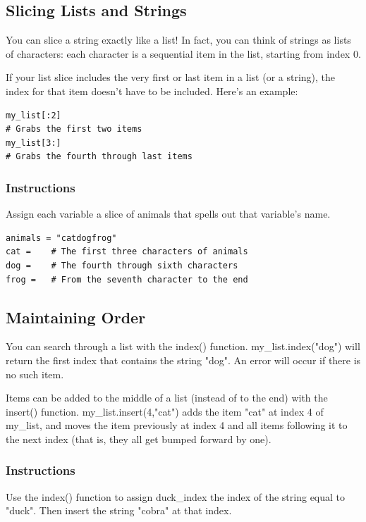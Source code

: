 \documentclass[12pt,a4paper,final,twoside,onecolumn,titlepage]{book}
\begin{document}
\subsection{Slicing Lists and Strings}

You can slice a string exactly like a list! In fact, you can think of strings as lists of characters: each character is a sequential item in the list, starting from index 0.

If your list slice includes the very first or last item in a list (or a string), the index for that item doesn't have to be included. Here's an example:
\begin{lstlisting}
my_list[:2]
# Grabs the first two items
my_list[3:]
# Grabs the fourth through last items
\end{lstlisting}
\subsubsection{Instructions}

Assign each variable a slice of animals that spells out that variable's name.

\begin{lstlisting}
animals = "catdogfrog"
cat =    # The first three characters of animals
dog =    # The fourth through sixth characters
frog =   # From the seventh character to the end
\end{lstlisting}

\subsection{Maintaining Order}

You can search through a list with the index() function. my\_list.index("dog") will return the first index that contains the string "dog". An error will occur if there is no such item.

Items can be added to the middle of a list (instead of to the end) with the insert() function. my\_list.insert(4,"cat") adds the item "cat" at index 4 of my\_list, and moves the item previously at index 4 and all items following it to the next index (that is, they all get bumped forward by one).
\subsubsection{Instructions}

Use the index() function to assign duck\_index the index of the string equal to "duck". Then insert the string "cobra" at that index.
\end{document}
